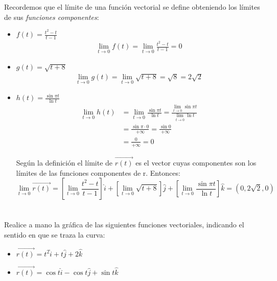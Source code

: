\documentclass[12pt]{article}
\begin{document}
Recordemos que el límite de una función vectorial se define obteniendo los límites de sus \textit{funciones componentes}:
\begin{itemize}[format=\textbf]

\item $f(t)=\frac{t^2-t}{t-1}$
  \begin{align*}
    \lim_{t \to 0} f(t) = \lim_{t \to 0} \frac{t^2-t}{t-1} = 0
  \end{align*}

\item $g(t)=\sqrt{t+8}$
  \begin{align*}
    \lim_{t \to 0} g(t) = \lim_{t \to 0} \sqrt{t+8} = \sqrt{8} = 2\sqrt{2}
  \end{align*}

\item $h(t)=\frac{\sin{\pi t}}{\ln{t}}$
  \begin{align*}
    \lim_{t \to 0} h(t) &= \lim_{t \to 0} \frac{\sin{\pi t}}{\ln{t}}
    = \frac{\lim_{t \to 0} \sin{\pi t} }{\lim_{t \to 0}\ln{t} } \\
    &= \frac{\sin {\pi \cdot 0}}{+\infty}  = \frac{\sin{0}}{+\infty}\\
    &= \frac{0}{+\infty} = 0
  \end{align*}

  Según la definición el límite de $\vec{r(t)}$ es el vector cuyas componentes son los límites de las funciones componentes de r. Entonces:
  \[
 \lim_{t \to 0} \vec{r(t)} = \left[ \lim_{t \to 0} \frac{t^2-t}{t-1} \right] \hat{i}+ \left[ \lim_{t \to 0} \sqrt{t+8} \right]\hat{j}+ \left[ \lim_{t \to 0} \frac{\sin{\pi t}}{\ln{t}} \right]\hat{k} = (0, 2\sqrt{2}, 0)
  \]
\end{itemize}

\section{}
Realice a mano la gráfica de las siguientes funciones vectoriales, indicando el sentido en que se traza la curva:
\begin{itemize}[format=\textbf]

\item $\vec{r(t)} = t^2\hat{i}+t\hat{j}+2\hat{k}$

\item $\vec{r(t)} = \cos{t}\hat{i}-\cos{t}\hat{j}+\sin{t}\hat{k}$

\end{itemize}
\end{document}
